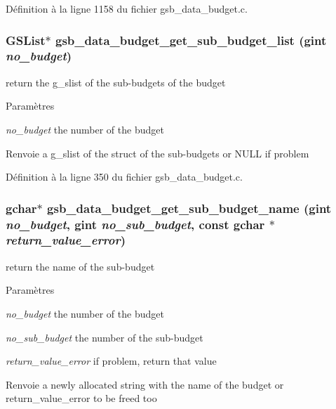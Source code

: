 Définition à la ligne 1158 du fichier gsb\_\-data\_\-budget.c.

\subsubsection[{gsb\_\-data\_\-budget\_\-get\_\-sub\_\-budget\_\-list}]{\setlength{\rightskip}{0pt plus 5cm}GSList$\ast$ gsb\_\-data\_\-budget\_\-get\_\-sub\_\-budget\_\-list (gint {\em no\_\-budget})}\label{gsb__data__budget_8h_a6bc99abfd66c75159af15d6531c3677e}
return the g\_\-slist of the sub-\/budgets of the budget


\begin{DoxyParams}{Paramètres}
\item[{\em no\_\-budget}]the number of the budget\end{DoxyParams}
\begin{DoxyReturn}{Renvoie}
a g\_\-slist of the struct of the sub-\/budgets or NULL if problem 
\end{DoxyReturn}


Définition à la ligne 350 du fichier gsb\_\-data\_\-budget.c.

\subsubsection[{gsb\_\-data\_\-budget\_\-get\_\-sub\_\-budget\_\-name}]{\setlength{\rightskip}{0pt plus 5cm}gchar$\ast$ gsb\_\-data\_\-budget\_\-get\_\-sub\_\-budget\_\-name (gint {\em no\_\-budget}, \/  gint {\em no\_\-sub\_\-budget}, \/  const gchar $\ast$ {\em return\_\-value\_\-error})}\label{gsb__data__budget_8h_a10e64049e14c7fba1d4281d418f34eab}
return the name of the sub-\/budget


\begin{DoxyParams}{Paramètres}
\item[{\em no\_\-budget}]the number of the budget \item[{\em no\_\-sub\_\-budget}]the number of the sub-\/budget \item[{\em return\_\-value\_\-error}]if problem, return that value\end{DoxyParams}
\begin{DoxyReturn}{Renvoie}
a newly allocated string with the name of the budget or return\_\-value\_\-error to be freed too 
\end{DoxyReturn}


